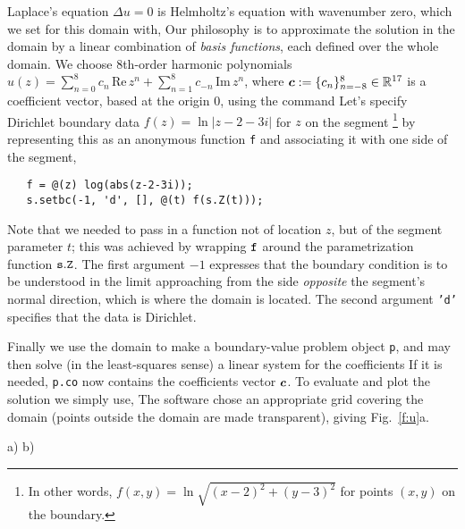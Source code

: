 \documentclass[11pt]{article}
\begin{document}
Laplace's equation $\Delta u = 0$ is Helmholtz's equation with wavenumber
zero, which we set for this domain with,
Our philosophy is
to approximate the solution in the domain by a linear combination of
{\em basis functions}, each defined over the whole domain.
We choose 8th-order harmonic polynomials
$u(z) = \sum_{n=0}^{8} c_n \,\mbox{Re}\,z^n +
\sum_{n=1}^{8} c_{-n}\,\mbox{Im}\,z^n$, where ${\bm c}:=\{c_n\}_{n=-8}^{8}
\in\mathbb{R}^{17}$
is a coefficient vector, based at the origin 0,
using the command
Let's specify Dirichlet boundary data $f(z) = 
\ln |z-2-3i|$ for
$z$ on the segment%
  \footnote{In other words, $f(x,y) = \ln \sqrt{(x-2)^2+(y-3)^2}$
    for points $(x,y)$ on the boundary.}
by representing this as an anonymous function {\tt f}
and associating it with one side of the segment,
\begin{verbatim}
   f = @(z) log(abs(z-2-3i));
   s.setbc(-1, 'd', [], @(t) f(s.Z(t)));
\end{verbatim}
Note that we needed to pass in a function not of location $z$,
but of the segment parameter $t$;
this was achieved by
wrapping ${\tt f}$ around the parametrization function ${\tt s.Z}$.
The first argument $-1$ expresses that the boundary condition is to be
understood in the limit approaching from the side {\em opposite} the
segment's normal direction, which is where the domain is located.
The second argument {\tt 'd'} specifies that the data is Dirichlet.
 
Finally we use the domain to make a boundary-value
problem object {\tt p},
and may then solve (in the least-squares sense)
a linear system for the coefficients
If it is needed, {\tt p.co} now contains the coefficients vector ${\bm c}$.
To evaluate and plot the solution we simply use,
The software chose an appropriate grid covering the domain
(points outside the domain are made transparent), giving Fig.~\ref{f:u}a.

\bfi %
a)
b)
\efi
\end{document}
